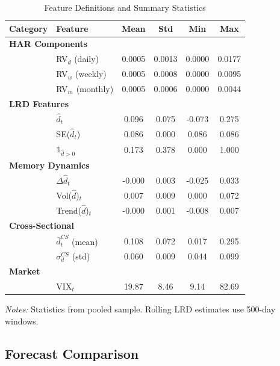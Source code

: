 \documentclass[12pt,a4paper]{article}
\begin{document}
\begin{table}[H]
\centering
\caption{Feature Definitions and Summary Statistics}
\label{tab:features}
\small
\begin{tabular}{llcccc}
\toprule
Category & Feature & Mean & Std & Min & Max \\
\midrule
\multicolumn{6}{l}{\textbf{HAR Components}} \\
  & RV$_d$ (daily) & 0.0005 & 0.0013 & 0.0000 & 0.0177 \\
  & RV$_w$ (weekly) & 0.0005 & 0.0008 & 0.0000 & 0.0095 \\
  & RV$_m$ (monthly) & 0.0005 & 0.0006 & 0.0000 & 0.0044 \\
\midrule
\multicolumn{6}{l}{\textbf{LRD Features}} \\
  & $\hat{d}_t$ & 0.096 & 0.075 & -0.073 & 0.275 \\
  & SE($\hat{d}_t$) & 0.086 & 0.000 & 0.086 & 0.086 \\
  & $\mathbb{1}_{\hat{d}>0}$ & 0.173 & 0.378 & 0.000 & 1.000 \\
\midrule
\multicolumn{6}{l}{\textbf{Memory Dynamics}} \\
  & $\Delta\hat{d}_t$ & -0.000 & 0.003 & -0.025 & 0.033 \\
  & Vol($\hat{d}$)$_t$ & 0.007 & 0.009 & 0.000 & 0.072 \\
  & Trend($\hat{d}$)$_t$ & -0.000 & 0.001 & -0.008 & 0.007 \\
\midrule
\multicolumn{6}{l}{\textbf{Cross-Sectional}} \\
  & $\bar{d}_t^{CS}$ (mean) & 0.108 & 0.072 & 0.017 & 0.295 \\
  & $\sigma_d^{CS}$ (std) & 0.060 & 0.009 & 0.044 & 0.099 \\
\midrule
\multicolumn{6}{l}{\textbf{Market}} \\
  & VIX$_t$ & 19.87 & 8.46 & 9.14 & 82.69 \\
\bottomrule
\end{tabular}
\begin{tablenotes}\small
\item \textit{Notes:} Statistics from pooled sample. Rolling LRD estimates use 500-day windows.
\end{tablenotes}
\end{table}

\subsection{Forecast Comparison}
\end{document}
